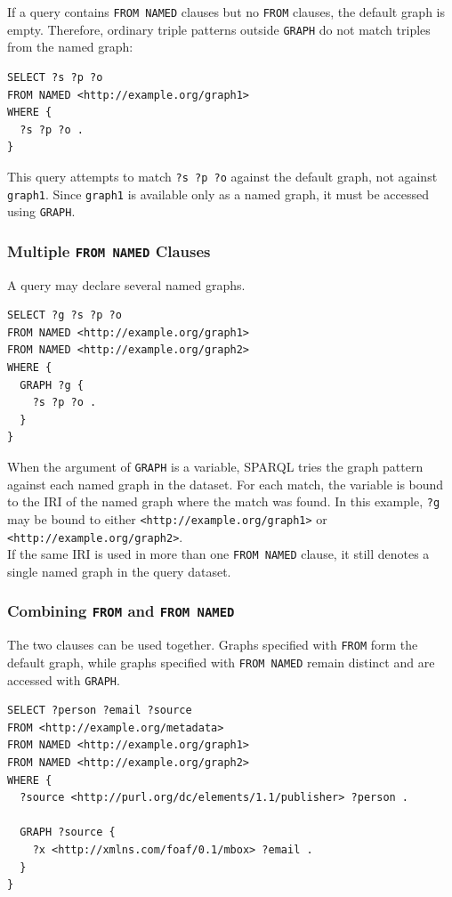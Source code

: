 \documentclass{scrbook}
\begin{document}
	If a query contains \texttt{FROM NAMED} clauses but no \texttt{FROM} clauses, the default graph is empty. Therefore, ordinary triple patterns outside \texttt{GRAPH} do not match triples from the named graph:
	
	\begin{lstlisting}
SELECT ?s ?p ?o
FROM NAMED <http://example.org/graph1>
WHERE {
  ?s ?p ?o .
}
	\end{lstlisting}
	
	This query attempts to match \texttt{?s ?p ?o} against the default graph, not against \texttt{graph1}. Since \texttt{graph1} is available only as a named graph, it must be accessed using \texttt{GRAPH}.
	
	\subsubsection{Multiple \texttt{FROM NAMED} Clauses}
	
	A query may declare several named graphs.
	
	\begin{lstlisting}
SELECT ?g ?s ?p ?o
FROM NAMED <http://example.org/graph1>
FROM NAMED <http://example.org/graph2>
WHERE {
  GRAPH ?g {
    ?s ?p ?o .
  }
}
	\end{lstlisting}
	
	When the argument of \texttt{GRAPH} is a variable, SPARQL tries the graph pattern against each named graph in the dataset. For each match, the variable is bound to the IRI of the named graph where the match was found. In this example, \texttt{?g} may be bound to either \texttt{<http://example.org/graph1>} or \texttt{<http://example.org/graph2>}.\\
	
	If the same IRI is used in more than one \texttt{FROM NAMED} clause, it still denotes a single named graph in the query dataset.
	
	\subsubsection{Combining \texttt{FROM} and \texttt{FROM NAMED}}
	
	The two clauses can be used together. Graphs specified with \texttt{FROM} form the default graph, while graphs specified with \texttt{FROM NAMED} remain distinct and are accessed with \texttt{GRAPH}.
	
	\begin{lstlisting}
SELECT ?person ?email ?source
FROM <http://example.org/metadata>
FROM NAMED <http://example.org/graph1>
FROM NAMED <http://example.org/graph2>
WHERE {
  ?source <http://purl.org/dc/elements/1.1/publisher> ?person .

  GRAPH ?source {
    ?x <http://xmlns.com/foaf/0.1/mbox> ?email .
  }
}
	\end{lstlisting}
	
\end{document}
